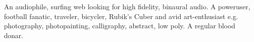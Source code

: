 

\begin{cvparagraph}

  An audiophile, surfing web looking for high fidelity, binaural audio.
  A poweruser, football fanatic, traveler, bicycler, Rubik's Cuber and avid art-enthusiast e.g. photography, photopainting, calligraphy, abstract, low poly. A regular blood donar.
\end{cvparagraph}  
